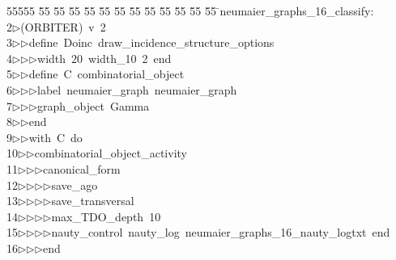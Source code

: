 %
%
\begin{tabbing}
55555 \= 55 \= 55 \= 55 \= 55 \= 55 \= 55 \= 55 \= 55 \= 55 \= 55 \= 55 \= 55 \= \>neumaier\_graphs\_16\_classify:\\[0pt]
2\>$\triangleright$\>(ORBITER)\ v\ 2\ \\[0pt]
3\>$\triangleright$\>$\triangleright$\>define\ Doinc\ draw\_incidence\_structure\_options\ \\[0pt]
4\>$\triangleright$\>$\triangleright$\>$\triangleright$\>width\ 20\ width\_10\ 2\ end\ \\[0pt]
5\>$\triangleright$\>$\triangleright$\>define\ C\ combinatorial\_object\ \\[0pt]
6\>$\triangleright$\>$\triangleright$\>$\triangleright$\>label\ neumaier\_graph\ neumaier\_graph\ \\[0pt]
7\>$\triangleright$\>$\triangleright$\>$\triangleright$\>graph\_object\ Gamma\ \\[0pt]
8\>$\triangleright$\>$\triangleright$\>end\ \\[0pt]
9\>$\triangleright$\>$\triangleright$\>with\ C\ do\ \\[0pt]
10\>$\triangleright$\>$\triangleright$\>combinatorial\_object\_activity\ \\[0pt]
11\>$\triangleright$\>$\triangleright$\>$\triangleright$\>canonical\_form\ \\[0pt]
12\>$\triangleright$\>$\triangleright$\>$\triangleright$\>$\triangleright$\>save\_ago\ \\[0pt]
13\>$\triangleright$\>$\triangleright$\>$\triangleright$\>$\triangleright$\>save\_transversal\ \\[0pt]
14\>$\triangleright$\>$\triangleright$\>$\triangleright$\>$\triangleright$\>max\_TDO\_depth\ 10\ \\[0pt]
15\>$\triangleright$\>$\triangleright$\>$\triangleright$\>$\triangleright$\>nauty\_control\ nauty\_log\ neumaier\_graphs\_16\_nauty\_logtxt\ end\ \\[0pt]
16\>$\triangleright$\>$\triangleright$\>$\triangleright$\>end\ \\[0pt]

\end{tabbing}
